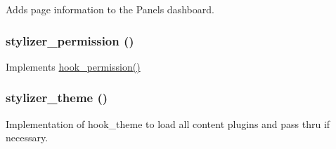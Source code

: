Adds page information to the Panels dashboard. \hypertarget{stylizer_8module_a9d624ecb21d6a13f01a4bb9caa98fe18}{
\subsubsection[{stylizer\_\-permission}]{\setlength{\rightskip}{0pt plus 5cm}stylizer\_\-permission ()}}
\label{stylizer_8module_a9d624ecb21d6a13f01a4bb9caa98fe18}
Implements \hyperlink{group__hooks_ga2b22b45f4925f2478412477bae329713}{hook\_\-permission()} \hypertarget{stylizer_8module_a5226a61bbe6d9de962a2f842db402993}{
\subsubsection[{stylizer\_\-theme}]{\setlength{\rightskip}{0pt plus 5cm}stylizer\_\-theme ()}}
\label{stylizer_8module_a5226a61bbe6d9de962a2f842db402993}
Implementation of hook\_\-theme to load all content plugins and pass thru if necessary. 